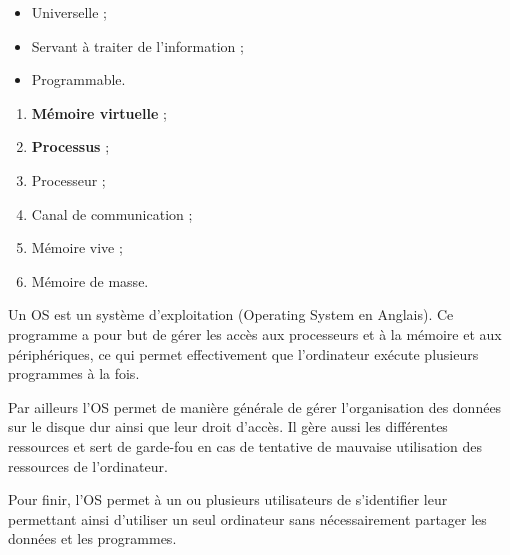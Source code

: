 \begin{minipage}{0.5\textwidth}
\question{}

\begin{itemize}
\item Universelle ; 
\item Servant à traiter de l'information ;
\item Programmable.
\end{itemize}
\end{minipage}
\begin{minipage}{0.5\textwidth}
\question{}

\begin{enumerate}[label=(\alph*)]
\item \textbf{Mémoire virtuelle} ;
\item \textbf{Processus} ;
\item Processeur ;
\item Canal de communication ;
\item Mémoire vive ;
\item Mémoire de masse.
\end{enumerate}
\end{minipage}





\question{}

Un OS est un système d'exploitation (Operating System en Anglais). 
Ce programme a pour but de gérer les accès aux processeurs et à la mémoire et aux périphériques, ce qui permet effectivement que l'ordinateur exécute plusieurs programmes à la fois.

Par ailleurs l'OS permet de manière générale de gérer l'organisation des données sur le disque dur ainsi que leur droit d'accès. Il gère aussi les différentes ressources et sert de garde-fou en cas de tentative de mauvaise utilisation des ressources de l'ordinateur.

Pour finir, l'OS permet à un ou plusieurs utilisateurs de s'identifier leur permettant ainsi d'utiliser un seul ordinateur sans nécessairement partager les données et les programmes. 